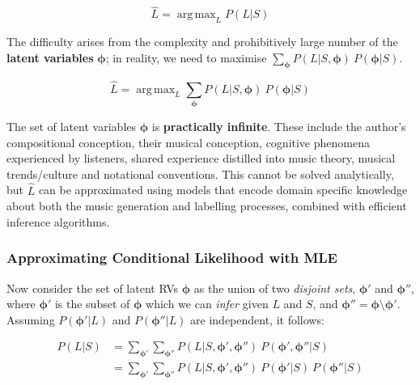 \documentclass[12pt,a4paper,twoside,openright]{report}
\DeclareMathOperator*{\argmax}{arg\,max}
\theoremstyle{definition}
\begin{document}
\begin{equation}
  \hat L = \argmax_L P\left(L|S\right)
  \label{eq:aceProbSol}
\end{equation}

The difficulty arises from the complexity and prohibitively large number of the \textbf{latent variables} $\bm{ \phi }$; in reality, we need to maximise $\sum\limits_{\bm{\phi}}P(L|S,\bm{ \phi })~P(\bm{\phi}|S)$.

\begin{equation}
  \hat L = \argmax_L \sum\limits_{\bm{\phi}} P(L | S,\bm{\phi})~P(\bm{\phi}|S)
  \label{eq:aceProbSolLatent}
\end{equation}

The set of latent variables $\bm{\phi}$ is \textbf{practically infinite}. These include the author's compositional conception, their musical conception, cognitive phenomena experienced by listeners, shared experience distilled into music theory, musical trends/culture and notational conventions. This cannot be solved analytically, but $\hat{L}$ can be approximated using models that encode domain specific knowledge about both the music generation and labelling processes, combined with efficient inference algorithms. 

\subsubsection{Approximating Conditional Likelihood with MLE}

Now consider the set of latent RVs $\bm{\phi}$ as the union of two \textit{disjoint sets}, $\bm{\phi'}$ and $\bm{\phi''}$, where $\bm{\phi'}$ is the subset of $\bm{\phi}$ which we can \textit{infer} given $L$ and $S$, and $\bm{\phi''} = \bm{\phi} \setminus \bm{\phi}'$. Assuming $P(\bm{\phi'} | L)$ and $P(\bm{\phi''} | L)$ are independent, it follows:

\begin{equation}
  \begin{aligned}
    P(L|S) &= \sum\limits_{\bm{\phi'}}\sum\limits_{\bm{\phi''}} P(L | S,\bm{\phi'},\bm{ \phi'' })~P(\bm{ \phi' }, \bm{ \phi'' } |S) \\
           &= \sum\limits_{\bm{\phi'}}\sum\limits_{\bm{\phi''}} P(L | S,\bm{\phi'},\bm{\phi''})~P(\bm{\phi'} | S)~P(\bm{\phi''} |S) 
  \end{aligned}
  \label{eq:aceProbSolLatent}
\end{equation}
\end{document}
